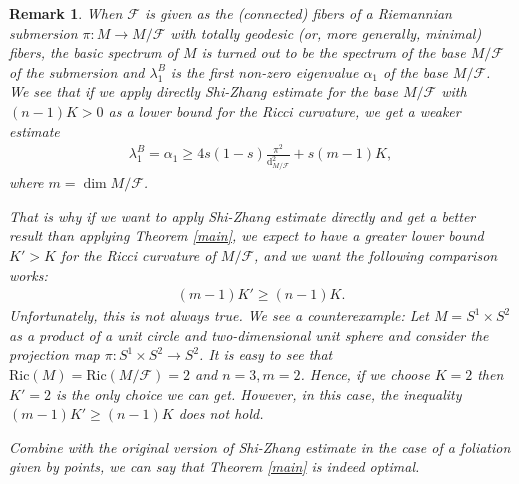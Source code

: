 \documentclass[11pt]{amsart}
\newtheorem{remark}[prop]{Remark}
\def\d{\mathrm{d}}
\def\ric{\mathrm{Ric}}
\begin{document}
\begin{remark}
When $\mathcal{F}$ is given as the (connected) fibers of a Riemannian submersion $\pi:M\to M/\mathcal{F}$ with totally geodesic (or, more generally, minimal) fibers, the basic spectrum of $M$ is turned out to be the spectrum of the base $M/\mathcal{F}$ of the submersion and $\lambda_1^B$ is the first non-zero eigenvalue $\alpha_1$ of the base $M/\mathcal{F}$. We see that if we apply directly Shi-Zhang estimate for the base $M/\mathcal{F}$ with $(n-1)K>0$ as a lower bound for the Ricci curvature, we get a weaker estimate
\begin{align*}
    \lambda_1^B=\alpha_1\geq 4s(1-s)\frac{\pi^2}{\d_{M/\mathcal{F}}^2}+s(m-1)K,
\end{align*}where $m=\dim M/\mathcal{F}$.

That is why if we want to apply Shi-Zhang estimate directly and get a better result than applying Theorem \ref{main}, we expect to have a greater lower bound $K'>K$ for the Ricci curvature of $M/\mathcal{F}$, and we want the following comparison works:
\begin{align*}
    (m-1)K'\geq (n-1)K.
\end{align*}
Unfortunately, this is not always true. We see a counterexample: Let $M=S^1\times S^2$ as a product of a unit circle and two-dimensional unit sphere and consider the projection map $\pi:S^1\times S^2\to S^2$. It is easy to see that $\ric(M)=\ric(M/\mathcal{F})=2$ and $n=3,m=2$. Hence, if we choose $K=2$ then $K'=2$ is the only choice we can get. However, in this case, the inequality $(m-1)K'\geq (n-1)K$ does not hold.

Combine with the original version of Shi-Zhang estimate in the case of a foliation given by points, we can say that Theorem \ref{main} is indeed optimal.


\end{remark}




\end{document}
